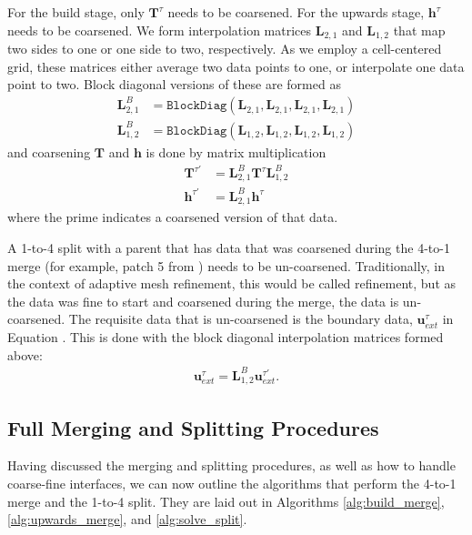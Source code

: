 For the build stage, only $\textbf{T}^{\tau}$ needs to be coarsened. For the upwards stage, $\textbf{h}^{\tau}$ needs to be coarsened. We form interpolation matrices $\textbf{L}_{2,1}$ and $\textbf{L}_{1,2}$ that map two sides to one or one side to two, respectively. As we employ a cell-centered grid, these matrices either average two data points to one, or interpolate one data point to two. Block diagonal versions of these are formed as
\begin{align}
    \textbf{L}_{2,1}^{B} &= \texttt{BlockDiag}(\textbf{L}_{2,1}, \textbf{L}_{2,1}, \textbf{L}_{2,1}, \textbf{L}_{2,1}) \\
    \textbf{L}_{1,2}^{B} &= \texttt{BlockDiag}(\textbf{L}_{1,2}, \textbf{L}_{1,2}, \textbf{L}_{1,2}, \textbf{L}_{1,2})
\end{align}
and coarsening $\textbf{T}$ and $\textbf{h}$ is done by matrix multiplication
\begin{align}
    \textbf{T}^{\tau'} &= \textbf{L}_{2,1}^{B} \textbf{T}^{\tau} \textbf{L}_{1,2}^{B} \\
    \textbf{h}^{\tau'} &= \textbf{L}_{2,1}^{B} \textbf{h}^{\tau}
\end{align}
where the prime indicates a coarsened version of that data.

A 1-to-4 split with a parent that has data that was coarsened during the 4-to-1 merge (for example, patch 5 from ) needs to be un-coarsened. Traditionally, in the context of adaptive mesh refinement, this would be called refinement, but as the data was fine to start and coarsened during the merge, the data is un-coarsened. The requisite data that is un-coarsened is the boundary data, $\textbf{u}^{\tau}_{ext}$ in Equation . This is done with the block diagonal interpolation matrices formed above:
\begin{align}
    \textbf{u}^{\tau}_{ext} = \textbf{L}_{1,2}^{B} \textbf{u}^{\tau'}_{ext}.
\end{align}

\subsection{Full Merging and Splitting Procedures}

Having discussed the merging and splitting procedures, as well as how to handle coarse-fine interfaces, we can now outline the algorithms that perform the 4-to-1 merge and the 1-to-4 split. They are laid out in Algorithms \ref{alg:build_merge}, \ref{alg:upwards_merge}, and \ref{alg:solve_split}.

